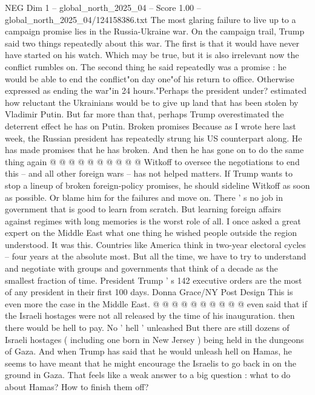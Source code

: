 \begin{textsample}{NEG Dim 1 – global\_north\_2025\_04 – Score 1.00 – global\_north\_2025\_04/124158386.txt}  \label{ex:f1_neg_102}
The most glaring failure to live up to a campaign promise lies in the Russia-Ukraine war.
On the campaign trail, Trump said two things repeatedly about this war.
The first is that it would have never have started on his watch.
Which may be true, but it is also irrelevant now the conflict rumbles on.
The second thing he said repeatedly was a promise : he would be able to end the conflict"on day one"of his return to office.
Otherwise expressed as ending the war"in 24 hours."Perhaps the president under? estimated how reluctant the Ukrainians would be to give up land that has been stolen by Vladimir Putin.
But far more than that, perhaps Trump overestimated the deterrent effect he has on Putin.
Broken promises Because as I wrote here last week, the Russian president has repeatedly strung his US counterpart along.
He has made promises that he has broken.
And then he has gone on to do the same thing again @ @ @ @ @ @ @ @ @ @ Witkoff to oversee the negotiations to end this -- and all other foreign wars -- has not helped matters.
If Trump wants to stop a lineup of broken foreign-policy promises, he should sideline Witkoff as soon as possible.
Or blame him for the failures and move on.
There ' s no job in government that is good to learn from scratch.
But learning foreign affairs against regimes with long memories is the worst role of all.
I once asked a great expert on the Middle East what one thing he wished people outside the region understood.
It was this.
Countries like America think in two-year electoral cycles -- four years at the absolute most.
But all the time, we have to try to understand and negotiate with groups and governments that think of a decade as the smallest fraction of time.
President Trump ' s 142 executive orders are the most of any president in their first 100 days.
Donna Grace/NY Post Design This is even more the case in the Middle East. @ @ @ @ @ @ @ @ @ @ even said that if the Israeli hostages were not all released by the time of his inauguration. then there would be hell to pay.
No ' hell ' unleashed But there are still dozens of Israeli hostages ( including one born in New Jersey ) being held in the dungeons of Gaza.
And when Trump has said that he would unleash hell on Hamas, he seems to have meant that he might encourage the Israelis to go back in on the ground in Gaza.
That feels like a weak answer to a big question : what to do about Hamas?
How to finish them off?

\end{textsample}
